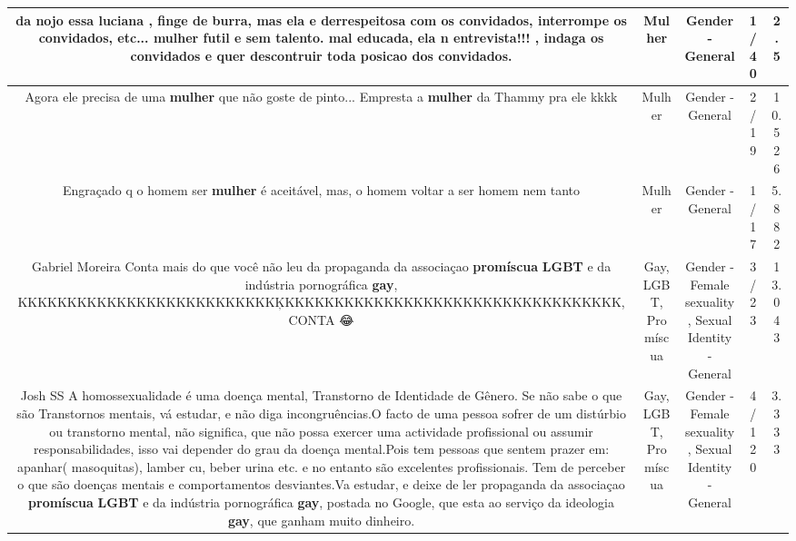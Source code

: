 \documentclass[11pt]{article}
\newlength\mylength
\begin{document}
\begin{center}
\begin{longtable}{|C{.65\mylength}|C{.30\mylength}|C{.12\mylength}|C{.12\mylength}|C{.12\mylength}|}
  \small da nojo essa luciana , finge de burra, mas ela e derrespeitosa com os convidados, interrompe os convidados, etc... \textbf{mulher} futil e sem talento. mal educada, ela n entrevista!!! ,  indaga os convidados e quer descontruir toda posicao dos convidados.\normalsize   & Mulher & Gender - General & 1/40 & 2.5 \\  \hline
  \small Agora ele precisa de uma \textbf{mulher} que não goste de pinto... Empresta a \textbf{mulher} da Thammy pra ele kkkk\normalsize   & Mulher & Gender - General & 2/19 & 10.526 \\  \hline
  \small Engraçado q o homem ser \textbf{mulher} é aceitável, mas, o homem voltar a ser homem nem tanto\normalsize   & Mulher & Gender - General & 1/17 & 5.882 \\  \hline
  \small Gabriel Moreira Conta mais do que você não leu da propaganda da associaçao \textbf{promíscua} \textbf{LGBT} e da indústria pornográfica \textbf{gay}, KKKKKKKKKKKKKKKKKKKKKKKKKKĶKKKKKKKKKKKKKKKKKKKKKKKKKKKKKKKKKK, CONTA 😂\normalsize   & Gay, LGBT, Promíscua & Gender - Female sexuality, Sexual Identity - General & 3/23 & 13.043 \\  \hline
  \small Josh SS A homossexualidade é uma doença mental, Transtorno de Identidade de Gênero. Se não sabe o que são Transtornos mentais, vá estudar, e não diga incongruências.O facto de uma pessoa sofrer de um distúrbio ou transtorno mental, não significa, que não possa exercer uma actividade profissional ou assumir responsabilidades, isso vai depender do grau da doença mental.Pois tem pessoas que sentem prazer em:  apanhar( masoquitas), lamber cu, beber urina etc. e no entanto são excelentes profissionais. Tem de perceber o que são doenças mentais e comportamentos desviantes.Va estudar, e deixe de ler propaganda da associaçao \textbf{promíscua} \textbf{LGBT} e da indústria pornográfica \textbf{gay}, postada no Google, que esta ao serviço da ideologia \textbf{gay}, que ganham muito dinheiro.\normalsize   & Gay, LGBT, Promíscua & Gender - Female sexuality, Sexual Identity - General & 4/120 & 3.333 \\  \hline

\end{longtable}
\end{center}
\end{document}
